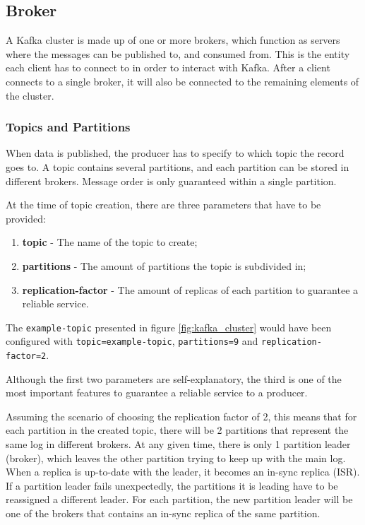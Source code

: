 \subsection{Broker}

A Kafka cluster is made up of one or more brokers, which function as servers
where the messages can be published to, and consumed from. This is the entity
each client has to connect to in order to interact with Kafka. After a client
connects to a single broker, it will also be connected to the remaining elements
of the cluster.

\subsubsection{Topics and Partitions}

When data is published, the producer has to specify to which topic the record
goes to. A topic contains several partitions, and each partition can be stored
in different brokers. Message order is only guaranteed within a single
partition.

At the time of topic creation, there are three parameters that have to be
provided: 
\begin{enumerate}
    \item \textbf{topic} - The name of the topic to create;
    \item \textbf{partitions} - The amount of partitions the topic is subdivided
        in;
    \item \textbf{replication-factor} - The amount of replicas of each partition
        to guarantee a reliable service.
\end{enumerate}
The \lstinline{example-topic} presented in figure \ref{fig:kafka_cluster} would have been
configured with \lstinline{topic=example-topic}, \lstinline{partitions=9} and
\lstinline{replication-factor=2}.

Although the first two parameters are self-explanatory, the third is one of the
most important features to guarantee a reliable service to a producer. 

Assuming the scenario of choosing the replication factor of 2, this means that
for each partition in the created topic, there will be 2 partitions that
represent the same log in different brokers. At any given time, there is only 1
partition leader (broker), which leaves the other partition trying to keep up
with the main log. When a replica is up-to-date with the leader, it becomes an
in-sync replica (ISR). If a partition leader fails unexpectedly, the partitions it is
leading have to be reassigned a different leader. For each partition, the new
partition leader will be one of the brokers that contains an in-sync replica of
the same partition.

